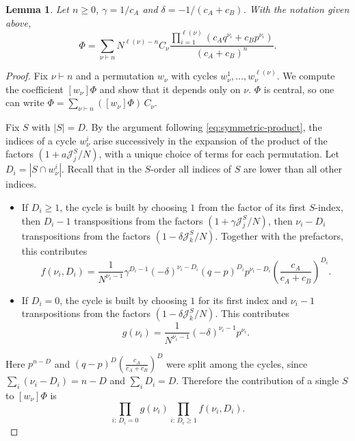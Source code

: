 \documentclass{article}
\theoremstyle{plain}
\newtheorem{lemma}[thm]{Lemma}
\theoremstyle{definition}
\numberwithin{equation}{section}
\begin{document}
\begin{lemma}
    \label{lem:classsum}
    Let $n\ge 0$, $\gamma=1/c_A$ and $\delta=-1/(c_A+c_B)$. With the notation given above,
    \begin{equation}
        \label{eq:C_nu}
        \Phi = \sum_{\nu \vdash n}   N^{\ell(\nu)-n} C_\nu \frac{\prod_{i=1}^{\ell(\nu)} (c_A q^{\nu_i} + c_B p^{\nu_i})}{(c_A+c_B)^{n}}.
    \end{equation}
\end{lemma}
\begin{proof}
    Fix $\nu\vdash n$ and a permutation $w_\nu$ with cycles $w_\nu^1,\dots,w_\nu^{\ell(\nu)}$. We compute the coefficient $[w_\nu]\Phi$ and show that it depends only on $\nu$. $\Phi$ is central, so one can write $\Phi=\sum_{\nu\vdash n}([w_\nu]\Phi)\,C_\nu$.

    Fix $S$ with $|S|=D$. By the argument following \eqref{eq:symmetric-product}, the indices of a cycle $w_\nu^i$ arise successively in the expansion of the product of the factors $(1+a\mathcal{J}_j^S/N)$, with a unique choice of terms for each permutation. Let $D_i=|S\cap w_\nu^i|$. Recall that in the $S$-order all indices of $S$ are lower than all other indices.
    \begin{itemize}
        \item If $D_i\ge1$, the cycle is built by choosing $1$ from the factor of its first $S$-index, then $D_i-1$ transpositions from the factors $(1+\gamma\mathcal{J}^S_j/N)$, then $\nu_i-D_i$ transpositions from the factors $(1-\delta\mathcal{J}^S_k/N)$. Together with the prefactors, this contributes
        \begin{equation}
            f(\nu_i,D_i)=\frac{1}{N^{\nu_i-1}}\gamma^{D_i-1}(-\delta)^{\nu_i-D_i}(q-p)^{D_i}p^{\nu_i-D_i}\left(\frac{c_A}{c_A+c_B}\right)^{D_i}.
        \end{equation}
        \item If $D_i=0$, the cycle is built by choosing $1$ for its first index and $\nu_i-1$ transpositions from the factors $(1-\delta\mathcal{J}_k^S/N)$. This contributes
        \begin{equation}
            g(\nu_i)=\frac{1}{N^{\nu_i-1}}(-\delta)^{\nu_i-1}p^{\nu_i}.
        \end{equation}
    \end{itemize}
    Here $p^{n-D}$ and $(q-p)^D\left(\frac{c_A}{c_A+c_B}\right)^D$ were split among the cycles, since $\sum_i(\nu_i-D_i)=n-D$ and $\sum_i D_i=D$. Therefore the contribution of a single $S$ to $[w_\nu]\Phi$ is
    \begin{equation}
        \prod_{i:\,D_i=0} g(\nu_i)\prod_{i:\,D_i\ge1} f(\nu_i,D_i).
    \end{equation}


\end{proof}
\end{document}
